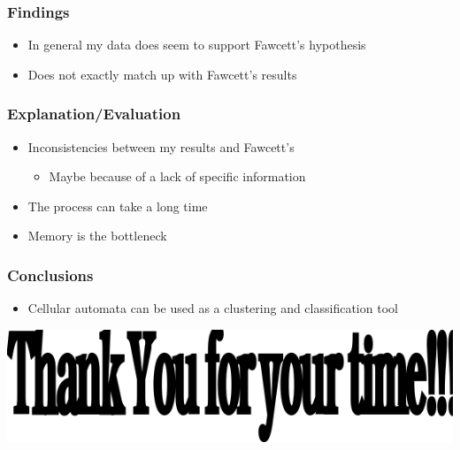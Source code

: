 \documentclass[presentation]{beamer}
\begin{document}
\begin{frame}
\frametitle{Findings}
\label{sec-5}

\begin{itemize}
\item In general my data does seem to support Fawcett's hypothesis
\item Does not exactly match up with Fawcett's results
\end{itemize}
\end{frame}
\begin{frame}
\frametitle{Explanation/Evaluation}
\label{sec-6}

\begin{itemize}
\item Inconsistencies between my results and Fawcett's

\begin{itemize}
\item Maybe because of a lack of specific information
\end{itemize}

\item The process can take a long time
\item Memory is the bottleneck
\end{itemize}
\end{frame}
\begin{frame}
\frametitle{Conclusions}
\label{sec-7}

\begin{itemize}
\item Cellular automata can be used as a clustering and classification
   tool
\end{itemize}
\end{frame}
\begin{frame}

  \includegraphics[width=30em \textwidth]{./thankyou.png}
\end{frame}
\end{document}
